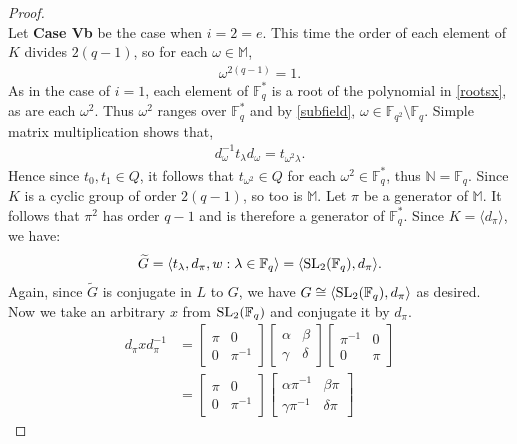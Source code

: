 \begin{proof}
\\
Let \textbf{Case Vb} be the case when $i = 2 = e$. This time the order of each element of $K$ divides $2(q-1)$, so for each $\omega \in \mathbb{M}$,
\begin{align}\label{roots} \omega^{2(q-1)} = 1.
\end{align}
As in the case of $i=1$, each element of $\mathbb{F}^*_q$ is a root of the polynomial in \eqref{rootsx}, as are each $\omega^2$. Thus $\omega^2$ ranges over $\mathbb{F}^*_q$ and by \eqref{subfield}, $\omega \in \mathbb{F}_{q^2} \setminus \mathbb{F}_q$. Simple matrix multiplication shows that, \\
\begin{align*} d_\omega^{-1} t_\lambda d_\omega = t_{\omega^2 \lambda}.
\end{align*}
Hence since $t_0, t_1 \in Q$, it follows that $t_{\omega^2} \in Q$ for each $\omega^2 \in \mathbb{F}^*_q$, thus $\mathbb{N} = \mathbb{F}_q$. Since $K$ is a cyclic group of order $2(q-1)$, so too is $\mathbb{M}$. Let $\pi$ be a generator of $\mathbb{M}$. It follows that $\pi^2$ has order $q-1$ and is therefore a generator of $\mathbb{F}^*_q$. Since $K = \langle d_\pi \rangle$, we have:
\begin{align*} {\widetilde{G}} = \langle t_\lambda, d_\pi, w : \lambda \in \mathbb{F}_q \rangle = \langle \operatorname{SL}_2(\mathbb{F}_q), d_\pi \rangle.
\end{align*}
Again, since ${\widetilde{G}}$ is conjugate in $L$ to $G$, we have $G \cong \langle \operatorname{SL}_2(\mathbb{F}_q), d_\pi \rangle$ as desired. Now we take an arbitrary $x$ from $\operatorname{SL}_2(\mathbb{F}_q)$ and conjugate it by $d_\pi$.
\begin{align*} d_\pi x d_\pi^{-1} &= \begin{bmatrix} \pi & 0 \\ 0 & \pi^{-1} \end{bmatrix} \begin{bmatrix} \alpha & \beta \\ \gamma & \delta \end{bmatrix}\begin{bmatrix} \pi^{-1} & 0 \\ 0 & \pi \end{bmatrix}
\\[1.5ex] &=  \begin{bmatrix} \pi & 0 \\ 0 & \pi^{-1} \end{bmatrix}  \begin{bmatrix} \alpha \pi^{-1} & \beta \pi \\ \gamma \pi^{-1} & \delta \pi \end{bmatrix}

\end{align*}
\end{proof}

